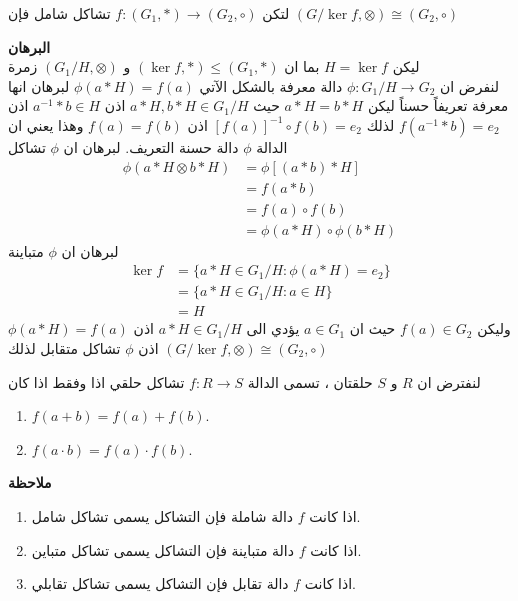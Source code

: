 \begin{theorem}
	لتكن 
	$f : (G_1, *) \to (G_2, \circ)$ تشاكل شامل فإن 
	$(G/\ker f, \otimes) \cong (G_2, \circ)$
\end{theorem}
\noindent
\textbf{البرهان}\\
\noindent
ليكن $H = \ker f$ بما ان
 $(\ker f, *) \leq (G_1, *)$ و 
 $(G_1/H, \otimes)$ 
زمرة\\
 لنفرض ان $\phi : G_1/H\to G_2$ دالة معرفة بالشكل الآتي $\phi(a*H) = f(a)$ لبرهان انها معرفة تعريفاً حسناً ليكن $a * H = b * H$ حيث 
 $a*H, b*H \in G_1/H$ اذن $a^{-1} * b\in H$ اذن $f(a^{-1}*b) = e_2$ لذلك $[f(a)]^{-1} \circ f(b) = e_2$ اذن $f(a) = f(b)$  وهذا يعني ان الدالة $\phi $ دالة حسنة التعريف.
 لبرهان ان $\phi$ تشاكل
 \begin{align*}
 	 \phi(a * H \otimes b*H) &= \phi[(a*b)*H]\\
 	  &= f(a*b)\\
 	   &= f(a)\circ f(b)\\
 	    &= \phi(a*H)\circ \phi(b*H) 
 \end{align*}
 لبرهان ان $\phi$ متباينة
 \begin{align*}
 	\ker f &= \{a*H \in G_1/H : \phi(a*H) = e_2\}\\
 	&= \{a*H \in G_1/H : a\in H\}\\
 	&= H
 \end{align*}
 وليكن $f(a) \in G_2$ حيث ان $a\in G_1$ يؤدي الى $a*H\in G_1/H$ اذن $\phi(a*H) = f(a)$
اذن $\phi$ تشاكل متقابل لذلك $(G/\ker f, \otimes) \cong (G_2, \circ)$
\newpage
\begin{definition}
	لنفترض ان $R$ و $S$ حلقتان ، تسمى الدالة $f:R\to S$ تشاكل حلقي اذا وفقط اذا كان
	\setLR
	\begin{enumerate}[label=(\arabic*)]
		\item $f(a + b) = f(a) + f(b)$.
		\item $f(a\cdot b) = f(a) \cdot f(b)$.
	\end{enumerate}
\end{definition}
\setRL
\noindent
\textbf{ملاحظة}
	\begin{enumerate}
	\item اذا كانت $f$ دالة شاملة فإن التشاكل يسمى تشاكل شامل.
	\item اذا كانت $f$ دالة متباينة فإن التشاكل يسمى تشاكل متباين.
	\item اذا كانت $f$ دالة تقابل فإن التشاكل يسمى تشاكل تقابلي.
\end{enumerate}

